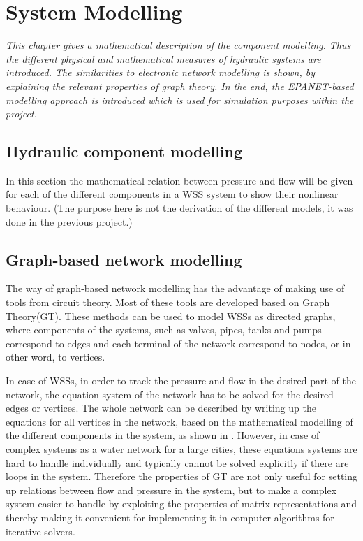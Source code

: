 \chapter{System Modelling}
\label{system_modelling}

\emph{This chapter gives a mathematical description of the component modelling. Thus the different physical and mathematical measures of hydraulic systems are introduced. The similarities to electronic network modelling is shown, by explaining the relevant properties of graph theory. In the end, the EPANET-based modelling approach is introduced which is used for simulation purposes within the project.}

\section{Hydraulic component modelling}
\label{hydraulic_component_modelling}

In this section the mathematical relation between pressure and flow will be given for each of the different components in a WSS system to show their nonlinear behaviour. (The purpose here is not the derivation of the different models, it was done in the previous project.)

\section{Graph-based network modelling}
\label{graph_based_network_modelling}

The way of graph-based network modelling has the advantage of making use of tools from circuit theory. Most of these tools are developed based on Graph Theory(GT). These methods can be used to model WSSs as directed graphs, where components of the systems, such as valves, pipes, tanks and pumps correspond to edges and each terminal of the network correspond to nodes, or in other word, to vertices. 

In case of WSSs, in order to track the pressure and flow in the desired part of the network, the equation system of the network has to be solved for the desired edges or vertices. The whole network can be described by writing up the equations for all vertices in the network, based on the mathematical modelling of the different components in the system, as shown in . However, in case of complex systems as a water network for a large cities, these equations systems are hard to handle individually and typically cannot be solved explicitly if there are loops in the system. Therefore the properties of GT are not only useful for setting up relations between flow and pressure in the system, but to make a complex system easier to handle by exploiting the properties of matrix representations and thereby making it convenient for implementing it in computer algorithms for iterative solvers.  

